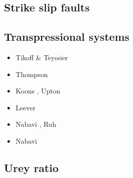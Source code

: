 \subsection{Strike slip faults} 


\textcite{tusp74}







\subsection{Transpressional systems} 

\begin{scriptsize}
\begin{itemize}
\item[\nineteenninetyfour] Tikoff \& Teyssier \cite{tite94}
\item[\nineteenninetyseven] Thompson \etal \cite{thsj97}
\item[\twothousandthree] Koons \etal \cite{konc03}, Upton \etal \cite{upke03}
\item[\twothousandeleven] Leever \etal \cite{legs11}
\item[\twothousandseventeen] Nabavi \etal \cite{naam17}, Ruh \etal \cite{rugb17}
\item[\twothousandeighteen] Nabavi \etal \cite{naam18}
\end{itemize}
\end{scriptsize}

\subsection{Urey ratio}

